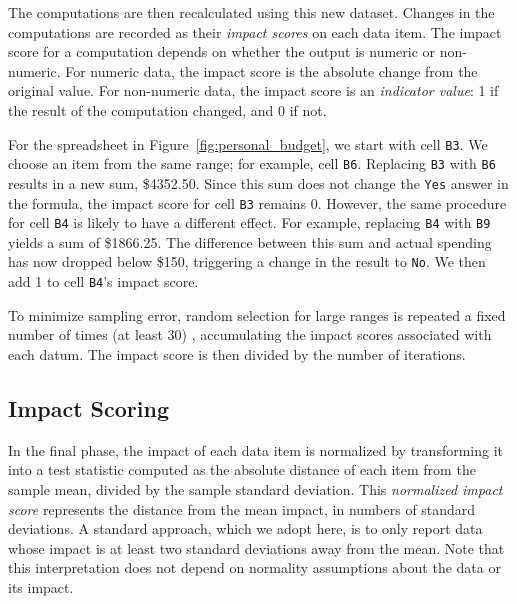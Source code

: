 The computations are then recalculated using this new dataset. Changes
in the computations are recorded as their \emph{impact scores} on each
data item.  The impact score for a computation depends on whether the
output is numeric or non-numeric. For numeric data, the impact score
is the absolute change from the original value.
For non-numeric data, the impact score is an \emph{indicator value}: 1
if the result of the computation changed, and 0 if not.

For the spreadsheet in Figure~\ref{fig:personal_budget}, we %
start with cell \texttt{B3}. We choose an item from the same
range; for example, cell \texttt{B6}. Replacing \texttt{B3}
with \texttt{B6} results in a new sum, \$4352.50. Since this sum does
not change the \texttt{Yes} answer in the formula, the impact score
for cell \texttt{B3} remains 0.
However, the same procedure for cell \texttt{B4} is likely to have a
different effect.  For example, replacing \texttt{B4}
with \texttt{B9} yields a sum of \$1866.25. The difference
between this sum and actual spending has now dropped below \$150,
triggering a change in the result to \texttt{No}. We then
add 1 to cell \texttt{B4}'s impact score.


To minimize sampling error, random
selection for large ranges is repeated a fixed number of times (at least 30) ,
accumulating the impact scores associated with each datum. The impact
score is then divided by the number of
iterations. 

\subsection{Impact Scoring}

In the final phase, the impact of each data item is normalized by transforming
it into a test statistic computed as the absolute distance of each item from
the sample mean, divided by the sample standard deviation. This
\emph{normalized impact score} represents the distance from the mean impact,
in numbers of standard deviations. A standard approach, which we adopt here,
is to only report data whose impact is at least two standard deviations away
from the mean. Note that this interpretation does not depend on normality
assumptions about the data or its impact.

